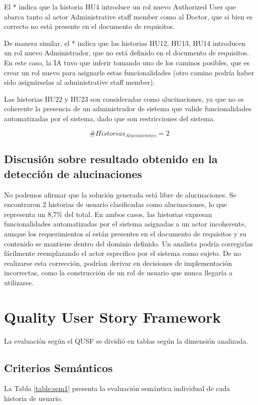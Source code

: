 El * indica que la historia HU4 introduce un rol nuevo Authorized User que abarca tanto al actor Administrative staff member como al Doctor, que si bien es correcto no está presente en el documento de requisitos.

De manera similar, el * indica que las historias HU12, HU13, HU14 introducen un rol nuevo Administrador, que no está definido en el documento de requisitos. En este caso, la IA tuvo que inferir tomando uno de los caminos posibles, que es crear un rol nuevo para asignarle estas funcionalidades (otro camino podría haber sido asignárselas al administrative staff member).

Las historias HU22 y HU23 son consideradas como alucinaciones, ya que no es coherente la presencia de un administrador de sistema que valide funcionalidades automatizadas por el sistema, dado que son restricciones del sistema.

\[\# Historias_{Alucinaciones} = 2 \]

\subsection{Discusión sobre resultado obtenido en la detección de alucinaciones}
No podemos afirmar que la solución generada está libre de alucinaciones. Se encontraron 2 historias de usuario clasificadas como alucinaciones, lo que representa un 8,7\% del total. En ambos casos, las historias expresan funcionalidades automatizadas por el sistema asignadas a un actor incoherente, aunque los requerimientos sí están presentes en el documento de requisitos y su contenido se mantiene dentro del dominio definido. Un analista podría corregirlas fácilmente reemplazando el actor específico por el sistema como sujeto. De no realizarse esta corrección, podrían derivar en decisiones de implementación incorrectas, como la construcción de un rol de usuario que nunca llegaría a utilizarse.

\section{Quality User Story Framework}

La evaluación según el QUSF se dividió en tablas según la dimensión analizada. 

\subsection{Criterios Semánticos}

La Tabla \ref{table:sem1} presenta la evaluación semántica individual de cada historia de usuario.

